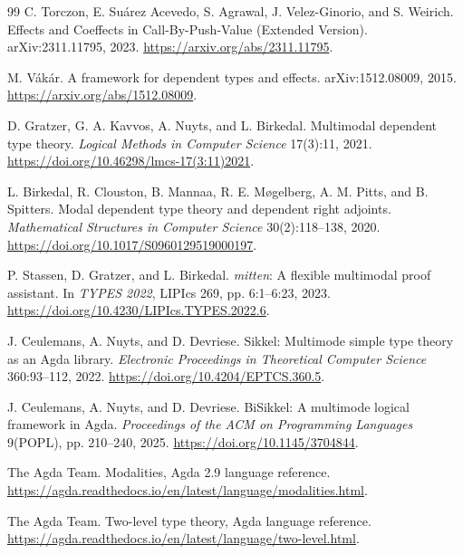 \documentclass[11pt]{article}
\theoremstyle{definition}
\theoremstyle{remark}
\begin{document}
\begin{thebibliography}{99}
C. Torczon, E. Su\'arez Acevedo, S. Agrawal, J. Velez-Ginorio, and S. Weirich.
\newblock Effects and Coeffects in Call-By-Push-Value (Extended Version).
\newblock arXiv:2311.11795, 2023.
\newblock \url{https://arxiv.org/abs/2311.11795}.

M. V\'ak\'ar.
\newblock A framework for dependent types and effects.
\newblock arXiv:1512.08009, 2015.
\newblock \url{https://arxiv.org/abs/1512.08009}.

D. Gratzer, G. A. Kavvos, A. Nuyts, and L. Birkedal.
\newblock Multimodal dependent type theory.
\newblock \emph{Logical Methods in Computer Science} 17(3):11, 2021.
\newblock \url{https://doi.org/10.46298/lmcs-17(3:11)2021}.

L. Birkedal, R. Clouston, B. Mannaa, R. E. M{\o}gelberg,
  A. M. Pitts, and B. Spitters.
\newblock Modal dependent type theory and dependent right adjoints.
\newblock \emph{Mathematical Structures in Computer Science}
  30(2):118--138, 2020.
\newblock \url{https://doi.org/10.1017/S0960129519000197}.

P. Stassen, D. Gratzer, and L. Birkedal.
\newblock \emph{mitten}: A flexible multimodal proof assistant.
\newblock In \emph{TYPES 2022}, LIPIcs 269, pp. 6:1--6:23, 2023.
\newblock \url{https://doi.org/10.4230/LIPIcs.TYPES.2022.6}.

J. Ceulemans, A. Nuyts, and D. Devriese.
\newblock Sikkel: Multimode simple type theory as an Agda library.
\newblock \emph{Electronic Proceedings in Theoretical Computer Science}
  360:93--112, 2022.
\newblock \url{https://doi.org/10.4204/EPTCS.360.5}.

J. Ceulemans, A. Nuyts, and D. Devriese.
\newblock BiSikkel: A multimode logical framework in Agda.
\newblock \emph{Proceedings of the ACM on Programming Languages} 9(POPL),
  pp. 210--240, 2025.
\newblock \url{https://doi.org/10.1145/3704844}.

The Agda Team.
\newblock Modalities, Agda 2.9 language reference.
\newblock \url{https://agda.readthedocs.io/en/latest/language/modalities.html}.

The Agda Team.
\newblock Two-level type theory, Agda language reference.
\newblock \url{https://agda.readthedocs.io/en/latest/language/two-level.html}.


\end{thebibliography}
\end{document}
